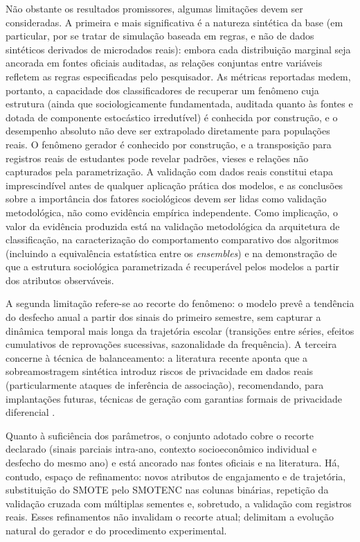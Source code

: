 Não obstante os resultados promissores, algumas limitações devem ser consideradas. A primeira e mais significativa é a natureza sintética da base (em particular, por se tratar de simulação baseada em regras, e não de dados sintéticos derivados de microdados reais): embora cada distribuição marginal seja ancorada em fontes oficiais auditadas, as relações conjuntas entre variáveis refletem as regras especificadas pelo pesquisador. As métricas reportadas medem, portanto, a capacidade dos classificadores de recuperar um fenômeno cuja estrutura (ainda que sociologicamente fundamentada, auditada quanto às fontes e dotada de componente estocástico irredutível) é conhecida por construção, e o desempenho absoluto não deve ser extrapolado diretamente para populações reais. O fenômeno gerador é conhecido por construção, e a transposição para registros reais de estudantes pode revelar padrões, vieses e relações não capturados pela parametrização. A validação com dados reais constitui etapa imprescindível antes de qualquer aplicação prática dos modelos, e as conclusões sobre a importância dos fatores sociológicos devem ser lidas como validação metodológica, não como evidência empírica independente. Como implicação, o valor da evidência produzida está na validação metodológica da arquitetura de classificação, na caracterização do comportamento comparativo dos algoritmos (incluindo a equivalência estatística entre os \textit{ensembles}) e na demonstração de que a estrutura sociológica parametrizada é recuperável pelos modelos a partir dos atributos observáveis.

A segunda limitação refere-se ao recorte do fenômeno: o modelo prevê a tendência do desfecho anual a partir dos sinais do primeiro semestre, sem capturar a dinâmica temporal mais longa da trajetória escolar (transições entre séries, efeitos cumulativos de reprovações sucessivas, sazonalidade da frequência). A terceira concerne à técnica de balanceamento: a literatura recente aponta que a sobreamostragem sintética introduz riscos de privacidade em dados reais (particularmente ataques de inferência de associação), recomendando, para implantações futuras, técnicas de geração com garantias formais de privacidade diferencial \cite{madugula2026, kostopoulos2026}.

Quanto à suficiência dos parâmetros, o conjunto adotado cobre o recorte declarado (sinais parciais intra-ano, contexto socioeconômico individual e desfecho do mesmo ano) e está ancorado nas fontes oficiais e na literatura. Há, contudo, espaço de refinamento: novos atributos de engajamento e de trajetória, substituição do SMOTE pelo SMOTENC nas colunas binárias, repetição da validação cruzada com múltiplas sementes e, sobretudo, a validação com registros reais. Esses refinamentos não invalidam o recorte atual; delimitam a evolução natural do gerador e do procedimento experimental.

